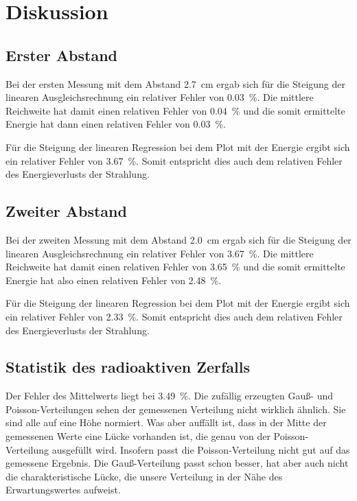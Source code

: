 \section{Diskussion}
\label{sec:Diskussion}

\subsection{Erster Abstand}

Bei der ersten Messung mit dem Abstand \SI{2.7}{\centi\meter} ergab sich für die Steigung der linearen Ausgleichsrechnung ein relativer Fehler von \SI{0.03}{\percent}. Die mittlere Reichweite hat damit einen relativen Fehler von \SI{0.04}{\percent } und die somit ermittelte Energie hat dann einen relativen Fehler von \SI{0.03}{\percent}. 

\noindent Für die Steigung der linearen Regression bei dem Plot mit der Energie ergibt sich ein relativer Fehler von \SI{3.67}{\percent}. Somit entspricht dies auch dem relativen Fehler des Energieverlusts der Strahlung. 

\subsection{Zweiter Abstand}

Bei der zweiten Messung mit dem Abstand \SI{2.0}{\centi\meter} ergab sich für die Steigung der linearen Ausgleichsrechnung ein relativer Fehler von \SI{3.67}{\percent}. Die mittlere Reichweite hat damit einen relativen Fehler von \SI{3.65}{\percent } und die somit ermittelte Energie hat also einen relativen Fehler von \SI{2.48}{\percent}. 

\noindent Für die Steigung der linearen Regression bei dem Plot mit der Energie ergibt sich ein relativer Fehler von \SI{2.33}{\percent}. Somit entspricht dies auch dem relativen Fehler des Energieverlusts der Strahlung. 

\subsection{Statistik des radioaktiven Zerfalls}

Der Fehler des Mittelwerts liegt bei \SI{3.49}{\percent}. 
Die zufällig erzeugten Gauß- und Poisson-Verteilungen sehen der gemessenen Verteilung nicht wirklich ähnlich. Sie sind alle auf eine Höhe normiert. Was aber auffällt ist, dass in der Mitte der gemessenen Werte eine Lücke vorhanden ist, die genau von der Poisson-Verteilung ausgefüllt wird. Insofern passt die Poisson-Verteilung nicht gut auf das gemessene Ergebnis. Die Gauß-Verteilung passt schon besser, hat aber auch nicht die charakteristische Lücke, die unsere Verteilung in der Nähe des Erwartungswertes aufweist. 
